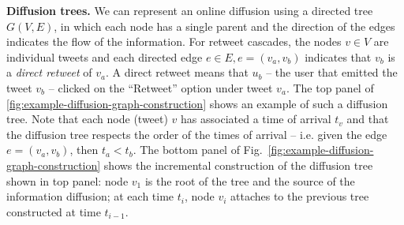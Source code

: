 \textbf{Diffusion trees.}
We can represent an online diffusion using a directed tree $G(V, E)$, in which each node has a single parent and the direction of the edges indicates the flow of the information.
For retweet cascades, the nodes $v \in V$ are individual tweets and each directed edge $e \in E, e = (v_a, v_b)$
indicates that $v_b$ is a \emph{direct retweet} of $v_a$.
A direct retweet means that $u_b$ -- the user that emitted the tweet $v_b$ -- clicked on the ``Retweet'' option under tweet $v_a$.
The top panel of \cref{fig:example-diffusion-graph-construction} shows an example of such a diffusion tree.
Note that each node (tweet) $v$ has associated a time of arrival $t_v$ and that the diffusion tree respects the order of the times of arrival -- i.e. given the edge $e = (v_a, v_b)$, then $t_a < t_b$.
The bottom panel of Fig.~\ref{fig:example-diffusion-graph-construction} shows the incremental construction of the diffusion tree shown in top panel:
node $v_1$ is the root of the tree and the source of the information diffusion;
at each time $t_i$, node $v_i$ attaches to the previous tree constructed at time $t_{i-1}$.






